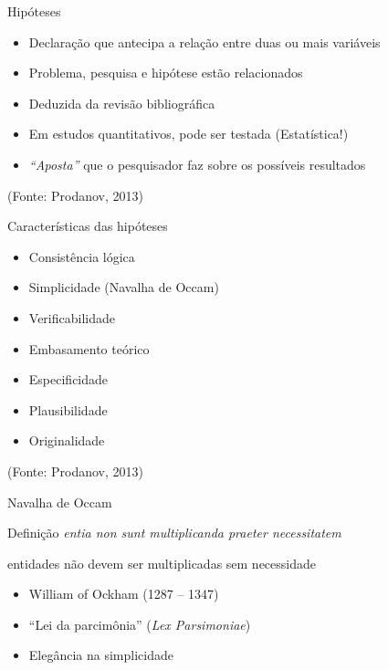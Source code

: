 \documentclass{beamer}
\begin{document}
\begin{frame}{Hipóteses}
  \begin{itemize}
    \footnotesize
  \item Declaração que antecipa a relação entre duas ou mais variáveis
    \bigskip
  \item Problema, pesquisa e hipótese estão relacionados
    \bigskip
  \item Deduzida da revisão bibliográfica
    \bigskip
  \item Em estudos quantitativos, pode ser testada (Estatística!)
    \bigskip
  \item {\em ``Aposta''} que o pesquisador faz sobre os possíveis
    resultados
  \end{itemize}

  \vfill
  \scriptsize
  \hfill (Fonte: Prodanov, 2013)
\end{frame}

\begin{frame}{Características das hipóteses}
  \begin{itemize}
    \footnotesize
  \item Consistência lógica
    \medskip
  \item Simplicidade (Navalha de Occam)
    \medskip
  \item Verificabilidade
    \medskip
  \item Embasamento teórico
    \medskip
  \item Especificidade
    \medskip
  \item Plausibilidade
    \medskip
  \item Originalidade
  \end{itemize}

  \vfill
  \scriptsize
  \hfill (Fonte: Prodanov, 2013)
\end{frame}

\begin{frame}{Navalha de Occam}
  \begin{block}{Definição}
    {\em entia non sunt multiplicanda praeter necessitatem}

    \bigskip
    entidades não devem ser multiplicadas sem necessidade
  \end{block}
  \bigskip
  \begin{itemize}
    \footnotesize
  \item William of Ockham (1287 -- 1347)
    \medskip
  \item ``Lei da parcimônia'' ({\em Lex Parsimoniae})
    \medskip
  \item Elegância na simplicidade
  \end{itemize}
\end{frame}
\end{document}
